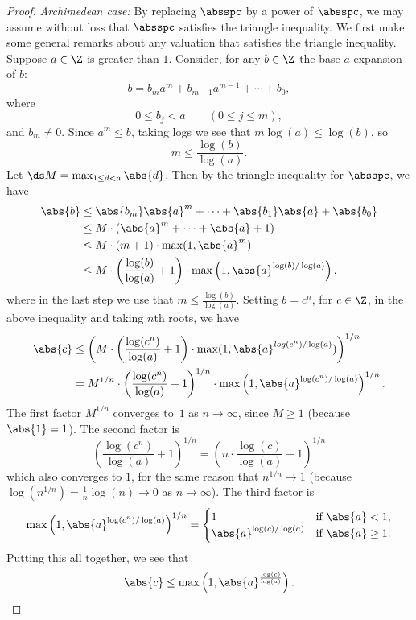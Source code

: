 \begin{proof}
{\em Archimedean case:} By replacing $\absspc$ by a power of
$\absspc$, we may assume without loss that $\absspc$ satisfies the
triangle inequality.  We first make some general remarks about any
valuation that satisfies the triangle inequality.  
Suppose $a\in\Z$ is greater than $1$.  Consider, for any $b\in\Z$
the base-$a$ expansion of $b$:
$$
  b = b_m a^m + b_{m-1} a^{m-1} + \cdots + b_0,
$$
where 
$$
  0 \leq b_j < a \qquad (0\leq j \leq m),
$$  
and $b_m\neq 0$.
Since $a^m\leq b$, taking logs we see that
$m\log(a)\leq \log(b)$, so 
$$m \leq \frac{\log(b)}{\log(a)}.$$
Let $\ds M=\max_{1\leq d<a}\abs{d}$.  Then by the triangle
inequality for $\absspc$, we have
\begin{align*}
\abs{b}&\leq \abs{b_m}\abs{a}^m + \cdots + \abs{b_1}\abs{a} + \abs{b_0}\\
    & \leq M\cdot (\abs{a}^m + \cdots + \abs{a} + 1)\\
   & \leq M\cdot (m+1)\cdot \max(1,\abs{a}^m)\\
   & \leq M\cdot\left(\frac{\log(b)}{\log(a)} + 1\right)
        \cdot \max\left(1,\abs{a}^{\log(b)/\log(a)}\right),
\end{align*}
where in the last step we use that $m\leq \frac{\log(b)}{\log(a)}$.
Setting $b=c^n$, for $c\in\Z$, in the above inequality and
taking $n$th roots, we have 
\begin{align*}
\abs{c} &\leq \left( M\cdot 
\left(\frac{\log(c^n)}{\log(a)}+1\right)\cdot
  \max(1,\abs{a}^{log(c^n)/\log(a)})\right)^{1/n}\\
  & = M^{1/n}\cdot\left(
       \frac{\log(c^n)}{\log(a)}+1\right)^{1/n}\cdot
      \max\left(1,\abs{a}^{\log(c^n)/\log(a)}\right)^{1/n}.
\end{align*}
The first factor $M^{1/n}$ converges to~$1$ as $n\to\infty$,
since $M\geq 1$ (because $\abs{1}=1$).  The second factor
is
$$
  \left(\frac{\log(c^n)}{\log(a)}+1\right)^{1/n}
   = 
\left(n \cdot \frac{\log(c)}{\log(a)}+1\right)^{1/n}
$$
which also converges to $1$, for the
same reason that $n^{1/n}\to 1$ 
(because $\log(n^{1/n})=\frac{1}{n}\log(n)\to 0$ as
$n\to\infty$).
The third factor is
$$
\max\left(1,\abs{a}^{\log(c^n)/\log(a)}\right)^{1/n}
  = \begin{cases}
   1 & \text{if }\abs{a}<1,\\
\abs{a}^{\log(c)/\log(a)} & \text{if }\abs{a}\geq 1.
\end{cases}
$$
Putting this all together, we see that
$$
\abs{c} \leq \max\left(1,\abs{a}^{\frac{\log(c)}{\log(a)}}\right).
$$


\end{proof}
